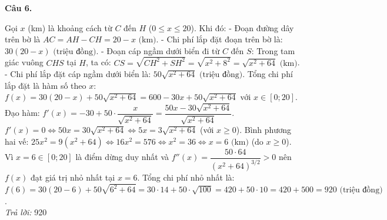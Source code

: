 \documentclass[12pt,a4paper]{article}
\newcommand{\loigiai}[1]{\par\medskip\Needspace{4\baselineskip}\noindent\textbf{#1}\par\nobreak}
\begin{document}
\loigiai{Câu 6.}
Gọi $x$ (km) là khoảng cách từ $C$ đến $H$ ($0\le x\le 20$).
Khi đó:
- Đoạn đường dây trên bờ là $AC = AH - CH = 20 - x\text{ (km)}$.
- Chi phí lắp đặt đoạn trên bờ là: $30(20 - x)\text{ (triệu đồng)}$.
- Đoạn cáp ngầm dưới biển đi từ $C$ đến $S$: Trong tam giác vuông $CHS$ tại $H$, ta có:
$CS = \sqrt{CH^2 + SH^2} = \sqrt{x^2 + 8^2} = \sqrt{x^2 + 64}\text{ (km)}$.
- Chi phí lắp đặt cáp ngầm dưới biển là: $50\sqrt{x^2 + 64}\text{ (triệu đồng)}$.
Tổng chi phí lắp đặt là hàm số theo $x$:
$f(x) = 30(20 - x) + 50\sqrt{x^2 + 64} = 600 - 30x + 50\sqrt{x^2 + 64}$ với $x\in[0;20]$.
Đạo hàm:
$f'(x) = -30 + 50\cdot\dfrac{x}{\sqrt{x^2 + 64}} = \dfrac{50x - 30\sqrt{x^2 + 64}}{\sqrt{x^2 + 64}}$.
$f'(x) = 0 \iff 50x = 30\sqrt{x^2 + 64} \iff 5x = 3\sqrt{x^2 + 64}$ (với $x\ge 0$).
Bình phương hai vế:
$25x^2 = 9(x^2 + 64) \iff 16x^2 = 576 \iff x^2 = 36 \iff x = 6\text{ (km)}$ (do $x\ge 0$).
Vì $x = 6\in [0;20]$ là điểm dừng duy nhất và $f''(x) = \dfrac{50\cdot 64}{(x^2 + 64)^{3/2}} > 0$ nên $f(x)$ đạt giá trị nhỏ nhất tại $x=6$.
Tổng chi phí nhỏ nhất là:
$f(6) = 30(20 - 6) + 50\sqrt{6^2 + 64} = 30\cdot 14 + 50\cdot\sqrt{100} = 420 + 50\cdot 10 = 420 + 500 = 920\text{ (triệu đồng)}$.\\
\textit{Trả lời:} 920
\end{document}
